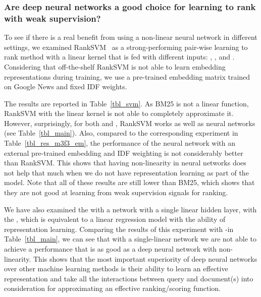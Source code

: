 
\subsubsection{Are deep neural networks a good choice for learning to rank with weak supervision?}
%
To see if there is a real benefit from using a non-linear neural network in different settings, we examined RankSVM~\citep{Joachims:2002} as a strong-performing pair-wise learning to rank method with a linear kernel that is fed with different inputs: \feedones, \feedtwos, and \feedthrees. Considering that off-the-shelf RankSVM is not able to learn embedding representations during training, we use a pre-trained embedding matrix trained on Google News and fixed IDF weights. 

The results are reported in Table~\ref{tbl_svm}. As BM25 is not a linear function, RankSVM with the linear kernel is not able to completely approximate it. However, surprisingly, for both \feedones and \feedtwos, RankSVM works as well as neural networks (see Table~\ref{tbl_main}). 
%
Also, compared to the corresponding experiment in Table~\ref{tbl_res_m3f3_em}, the performance of the neural network with an external pre-trained embedding and IDF weighting is not considerably better than RankSVM. 
This shows that having non-linearity in neural networks does not help that much when we do not have representation learning as part of the model.
%
Note that all of these results are still lower than BM25, which shows that they are not good at learning from weak supervision signals for ranking. 
%

We have also examined the \modelone with a network with a single linear hidden layer, with the \feedthree, which is equivalent to a linear regression model with the ability of representation learning. 
Comparing the results of this experiment with \mone-\fthree in Table~\ref{tbl_main}, we can see that with a single-linear network we are not able to achieve a performance that is as good as a deep neural network with non-linearity.
%
This shows that the most important superiority of deep neural networks over other machine learning methods is their ability to learn an effective representation and take all the interactions between query and document(s) into consideration for approximating an effective ranking/scoring function. 

